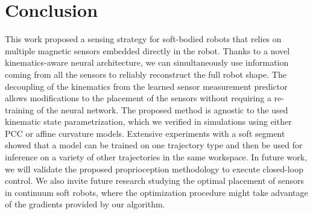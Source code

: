 \section{Conclusion}\label{sec:promasens:conclusion}

This work proposed a sensing strategy for soft-bodied robots that relies on multiple magnetic sensors embedded directly in the robot. Thanks to a novel kinematics-aware neural architecture, we can simultaneously use information coming from all the sensors to reliably reconstruct the full robot shape. 
The decoupling of the kinematics from the learned sensor measurement predictor allows modifications to the placement of the sensors without requiring a re-training of the neural network.
The proposed method is agnostic to the used kinematic state parametrization, which we verified in simulations using either PCC or affine curvature models.
Extensive experiments with a soft segment showed that a model can be trained on one trajectory type and then be used for inference on a variety of other trajectories in the same workspace.
In future work, we will validate the proposed proprioception methodology to execute closed-loop control. %
We also invite future research studying the optimal placement of sensors in continuum soft robots, where the optimization procedure might take advantage of the gradients provided by our algorithm.
